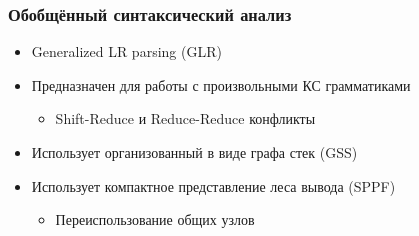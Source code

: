 \documentclass{beamer}
\begin{document}
\begin{frame}[fragile]
	\transwipe[direction=90]
	\frametitle{Обобщённый синтаксический анализ}
    \begin{itemize}
    	\item Generalized LR parsing (GLR)
    	\item Предназначен для работы с произвольными КС грамматиками
	    \begin{itemize}
    	    \item Shift-Reduce и Reduce-Reduce конфликты
    	\end{itemize}
    	\item Использует организованный в виде графа стек (GSS)
    	\item Использует компактное представление леса вывода (SPPF)
	        \begin{itemize}
	            \item Переиспользование общих узлов
	        \end{itemize}
	\end{itemize}
\end{frame}
\end{document}
